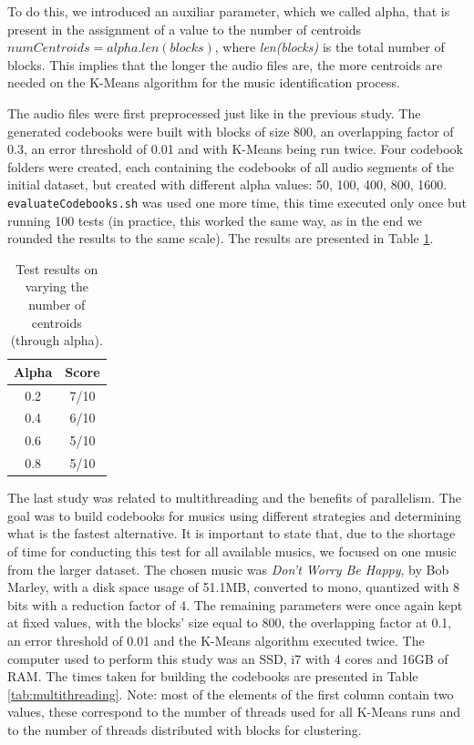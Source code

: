 \documentclass[12pt]{article}
\begin{document}
To do this, we introduced an auxiliar parameter, which we called alpha, that is 
present in the assignment of a value to the number of centroids 
$numCentroids = alpha . len(blocks)$, where {\it len(blocks)\/} is the total 
number of blocks.
This implies that the longer the audio files are, the more centroids are needed
on the K-Means algorithm for the music identification process.

The audio files were first preprocessed just like in the previous study.
The generated codebooks were built with blocks of size 800, an overlapping 
factor of 0.3, an error threshold of 0.01 and with K-Means being run twice.
Four codebook folders were created, each containing the codebooks of all audio
segments of the initial dataset, but created with different alpha values:
50, 100, 400, 800, 1600.
\texttt{evaluateCodebooks.sh} was used one more time, this time executed only 
once but running 100 tests (in practice, this worked the same way, as in the end 
we rounded the results to the same scale).
The results are presented in Table \ref{tab:numcentroids}.

\begin{table}[H]
  \begin{center}
    \begin{tabular}{c|c}
      \textbf{Alpha} & \textbf{Score}\\
      \hline
      0.2 & 7/10\\
      0.4 & 6/10\\
      0.6 & 5/10\\
      0.8 & 5/10\\
    \end{tabular}
  \end{center}
  \caption{Test results on varying the number of centroids (through alpha).}
  \label{tab:numcentroids}
\end{table}

The last study was related to multithreading and the benefits of parallelism.
The goal was to build codebooks for musics using different strategies and
determining what is the fastest alternative.
It is important to state that, due to the shortage of time for conducting this 
test for all available musics, we focused on one music from the larger dataset.
The chosen music was {\it Don't Worry Be Happy\/}, by Bob Marley, with a disk 
space usage of 51.1MB, converted to mono, quantized with 8 bits with a reduction 
factor of 4.
The remaining parameters were once again kept at fixed values, with the blocks'
size equal to 800, the overlapping factor at 0.1, an error threshold of 0.01 and
the K-Means algorithm executed twice.
The computer used to perform this study was an SSD, i7 with 4 cores and 16GB of RAM.
The times taken for building the codebooks are presented in Table \ref{tab:multithreading}.
Note: most of the elements of the first column contain two values, these 
correspond to the number of threads used for all K-Means runs and to the number
of threads distributed with blocks for clustering.
\end{document}
